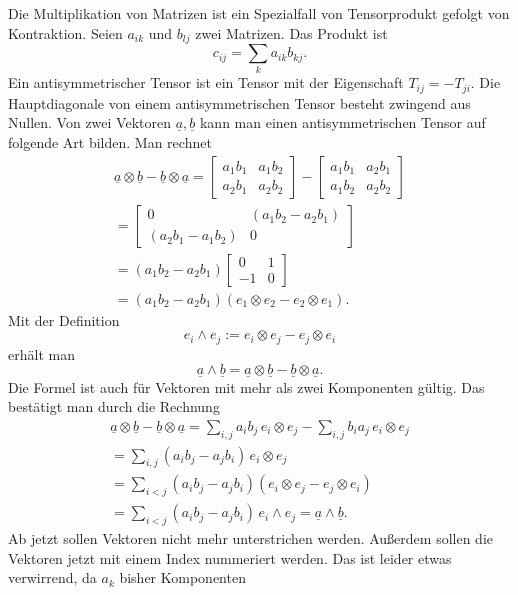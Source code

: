 \documentclass[a4paper,10pt,fleqn,twocolumn,twoside]{article}
\begin{document}
Die Multiplikation von Matrizen ist ein Spezialfall
von Tensorprodukt gefolgt von Kontraktion.
Seien $a_{ik}$ und $b_{lj}$
zwei Matrizen. Das Produkt ist
\[c_{ij} = \sum_{k}a_{ik}b_{kj}.\]
%
Ein antisymmetrischer Tensor ist ein Tensor mit der Eigenschaft
$T_{ij}=-T_{ji}$. Die Hauptdiagonale von einem antisymmetrischen
Tensor besteht zwingend aus Nullen.
Von zwei Vektoren $\underline a,\underline b$ kann man
einen antisymmetrischen Tensor auf folgende Art bilden. Man rechnet
\begin{gather*}\underline a\otimes\underline b
- \underline b\otimes \underline a
= \begin{bmatrix}
a_1 b_1 & a_1 b_2\\
a_2 b_1 & a_2 b_2
\end{bmatrix}
- \begin{bmatrix}
a_1 b_1 & a_2 b_1\\
a_1 b_2 & a_2 b_2
\end{bmatrix}\\
= \begin{bmatrix}
0 & (a_1 b_2-a_2 b_1)\\
(a_2 b_1 - a_1 b_2) & 0
\end{bmatrix}\\
= (a_1 b_2 - a_2 b_1) \begin{bmatrix}
0 & 1\\
-1 & 0
\end{bmatrix}\\
= (a_1 b_2 - a_2 b_1) (e_1\otimes e_2 - e_2\otimes e_1).
\end{gather*}
Mit der Definition
\[e_i\wedge e_j := e_i\otimes e_j - e_j\otimes e_i\]
erhält man
\[\underline a\wedge\underline b
= \underline a\otimes\underline b
- \underline b\otimes \underline a.\]
Die Formel ist auch für Vektoren mit mehr als zwei Komponenten gültig.
Das bestätigt man durch die Rechnung
\begin{gather*}
\underline a\otimes\underline b
- \underline b\otimes \underline a
= \sum_{i,j} a_ib_j\,e_i\otimes e_j
- \sum_{i,j} b_ia_j\,e_i\otimes e_j\\
= \sum_{i,j} (a_ib_j-a_jb_i)\,e_i\otimes e_j\\
= \sum_{i<j} (a_ib_j-a_jb_i)(e_i\otimes e_j-e_j\otimes e_i)\\
= \sum_{i<j} (a_ib_j-a_jb_i)\,e_i\wedge e_j
= \underline a\wedge\underline b.
\end{gather*}
Ab jetzt sollen Vektoren nicht mehr unterstrichen werden.
Außerdem sollen die Vektoren jetzt mit einem Index nummeriert
werden. Das ist leider etwas verwirrend, da $a_k$ bisher Komponenten
\end{document}
